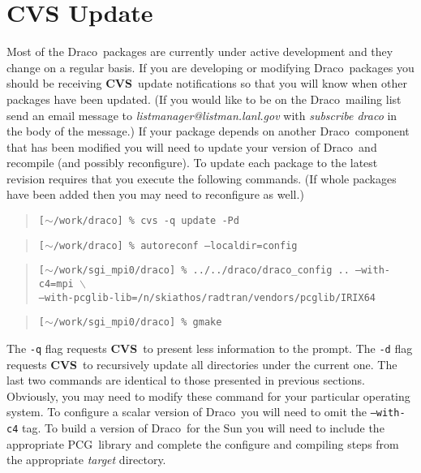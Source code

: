 \documentclass[11pt]{nmemo}
\newcommand{\comp}[1]{\normalfont\normalsize\texttt{#1}}
\newcommand{\draco}{{\normalfont\sffamily Draco}}
\newcommand{\pcg}{{\normalfont\sffamily PCG}}
\newcommand{\cvs}{{\normalfont\bfseries CVS}}
\begin{document}
\section{CVS Update}

Most of the \draco\ packages are currently under active development
and they change on a regular basis.  If you are developing or
modifying \draco\ packages you should be receiving \cvs\ update
notifications so that you will know when other packages have been
updated.  (If you would like to be on the \draco\ mailing list send an
email message to \emph{listmanager@listman.lanl.gov} with
\emph{subscribe draco} in the body of the message.)  If your package
depends on another \draco\ component that has been modified you will
need to update your version of \draco\ and recompile (and possibly
reconfigure).  To update each package to the latest revision requires
that you execute the following commands.  (If whole packages have been
added then you may need to reconfigure as well.)

\begin{verse}
\texttt{[$\sim$/work/draco] \% cvs -q update -Pd}
\end{verse}

\begin{verse}
\texttt{[$\sim$/work/draco] \% autoreconf --localdir=config }
\end{verse}

\begin{verse}
\texttt{[$\sim$/work/sgi\_mpi0/draco] \% ../../draco/draco\_config
.. --with-c4=mpi $\backslash$ \\
\hspace{0.5in}--with-pcglib-lib=/n/skiathos/radtran/vendors/pcglib/IRIX64}
\end{verse}

\begin{verse}
\texttt{[$\sim$/work/sgi\_mpi0/draco] \% gmake}
\end{verse}

The \comp{-q} flag requests \cvs\ to present less information to the
prompt.  The \comp{-d} flag requests \cvs\ to recursively update all
directories under the current one.  The last two commands are
identical to those presented in previous sections.  Obviously, you may
need to modify these command for your particular operating system.  To
configure a scalar version of \draco\ you will need to omit the
\comp{--with-c4} tag.  To build a version of \draco\ for the Sun you
will need to include the appropriate \pcg\ library and complete the
configure and compiling steps from the appropriate \emph{target}
directory.
\end{document}
